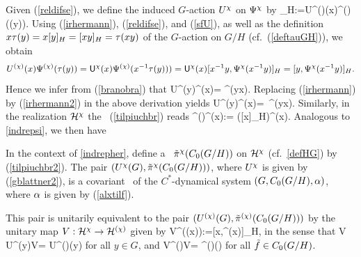 Given (\ref{reldifse}), we define the induced $G$-action $U^{\chi}$ on $\Psi^{\chi}$ by
\be
[y,U^{\ch}(x)\Ps^{\ch}(y)]_H:=U^{(\ch)}(x)\Ps^{(\ch)}(\ta(y)).
\ee
Using (\ref{irhermann}), (\ref{reldifse}), and (\ref{sfU}), as well as the
definition $x\tau(y)=x[y]_H=[xy]_H=\tau(xy)$ of the $G$-action on $G/H$ (cf.\ 
 (\ref{deftauGH})), we obtain
$$
U^{(\chi)}(x)\Psi^{(\chi)}(\tau(y))={\sf U}^{\chi}(x) \Psi^{(\chi)}(x^{-1}
\tau(y)))= {\sf U}^{\chi}(x)[x^{-1} y,\Psi^{\chi}(x^{-1} y)]_H= [y,\Psi^{\chi}(x^{-1} y)]_H.
$$
Hence we infer from (\ref{branobra}) that
\be
 U^{\ch}(y)\Ps^{\ch}(x)= 
\Ps^{\ch}(y\inv x). 
\ee
Replacing (\ref{irhermann}) by  (\ref{irhermann2}) in the above derivation yields
\be
 U^{\ch}(y)\Ps^{\ch}(x)=\,
\Ps^{\ch}(y\inv x). \ll{gblattner2}
\ee
Similarly, in the realization ${\cal H}^{\chi}$ the \rep\ (\ref{tilpiuchbr}) reads
\be
\til{\pi}^{\ch}()\Ps^{\ch}(x):= ([x]_H)\Ps^{\ch}(x). 
\ee
Analogous to \ref{indrepsi}, we then have
\begin{Proposition}
In the context of \ref{indrepher}, define a \rep\
$\tilde{\pi}^{\chi}(C_0(G/H))$ on ${\cal H}^{\chi}$ (cf.\ \ref{defHG}) 
by (\ref{tilpiuchbr2}).  The
pair $(U^{\chi}(G),\tilde{\pi}^{\chi}(C_0(G/H)))$, where $U^{\chi}$ is
given by (\ref{gblattner2}), is a covariant \rep\ of the
$C^*$-dynamical system $(G,C_0(G/H),\alpha)$, where $\alpha$ is given by
(\ref{alxtilf}).

This pair is unitarily equivalent to the pair
$(U^{(\chi)}(G),\tilde{\pi}^{(\chi)}(C_0(G/H)))$ by the unitary map
$V:{\cal H}^{\chi}\rightarrow{\cal H}^{(\chi)}$ given by \be
V\Ps^{\ch}(\ta(x)):=[x,\Ps^{\ch}(x)]_H, \ll{VlowH} \ee in the sense
that \be V U^{\ch}(y)V\inv= U^{(\ch)}(y)  \ee for all $y\in
G$, and \be V\til{\pi}^{\ch}()V\inv= \til{\pi}^{(\ch)}(\til{f})
\ll{chp2} \ee for all $\tilde{f}\in C_0(G/H)$.
\end{Proposition}

